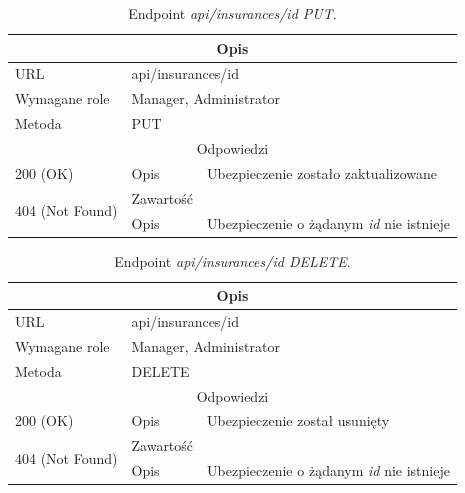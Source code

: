 \documentclass[eng,printmode,openany]{mgr}
\begin{document}
	\begin{table}[H]
		\caption{Endpoint \textit{api/insurances/id PUT}.}
		\begin{tabularx}{\textwidth}{|l|l|X|}
			\hline
			\multicolumn{3}{|c|}{Opis}
			\\ \hline
			URL                       & \multicolumn{2}{l|}{api/insurances/id}
			\\ \hline
			Wymagane role             & \multicolumn{2}{l|}{Manager, Administrator}
			\\ \hline
			Metoda                    & \multicolumn{2}{l|}{PUT}
			\\ \hline
			\multicolumn{3}{|c|}{Odpowiedzi}
			\\ \hline
			200 (OK) 		                        & Opis      	& Ubezpieczenie zostało zaktualizowane
			\\ \hline
			\multirow{2}{*}{404 (Not Found)} 	    & Zawartość     & 
			\\ \cline{2-3}                          & Opis          & Ubezpieczenie o żądanym \textit{id} nie istnieje
			\\ \hline
		\end{tabularx}
	\end{table}
	
	\begin{table}[H]
		\caption{Endpoint \textit{api/insurances/id DELETE}.}
		\begin{tabularx}{\textwidth}{|l|l|X|}
			\hline
			\multicolumn{3}{|c|}{Opis}
			\\ \hline
			URL                       & \multicolumn{2}{l|}{api/insurances/id}
			\\ \hline
			Wymagane role             & \multicolumn{2}{l|}{Manager, Administrator}
			\\ \hline
			Metoda                    & \multicolumn{2}{l|}{DELETE}
			\\ \hline
			\multicolumn{3}{|c|}{Odpowiedzi}
			\\ \hline
			200 (OK)			                & Opis         	& Ubezpieczenie został usunięty
			\\ \hline
			\multirow{2}{*}{404 (Not Found)} 	& Zawartość     & 
			\\ \cline{2-3}                      & Opis          & Ubezpieczenie o żądanym \textit{id} nie istnieje
			\\ \hline
		\end{tabularx}
	\end{table}
	
\end{document}
